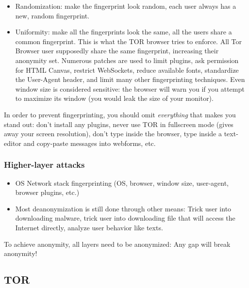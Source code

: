 \documentclass[11pt,oneside,a4paper]{article}
\begin{document}
\vspace{-\topsep}
\begin{itemize}
	\setlength{\itemsep}{0pt}
	\setlength{\parskip}{0pt}
	\item Randomization: make the fingerprint look random, each user always has a new, random fingerprint.
	\item Uniformity: make all the fingerprints look the same, all the users share a common	fingerprint. This is what the TOR browser tries to enforce. All Tor Browser user supposedly share the same fingerprint, increasing their anonymity set. Numerous patches are used to limit plugins, ask permission for HTML Canvas, restrict WebSockets, reduce available fonts, standardize the User-Agent header, and limit many other fingerprinting techniques. Even window size is considered sensitive: the browser will warn you if you attempt to maximize its window (you would leak the size of your monitor).
\end{itemize}
\vspace{-\topsep}

\noindent In order to prevent fingerprinting, you should omit \textit{everything} that makes you stand out: don't install any plugins, never use TOR in fullscreen mode (gives away your screen resolution), don't type inside the browser, type inside a text-editor and copy-paste messages into webforms, etc.

\subsubsection{Higher-layer attacks}

\vspace{-\topsep}
\begin{itemize}
	\setlength{\itemsep}{0pt}
	\setlength{\parskip}{0pt}
	\item OS Network stack fingerprinting (OS, browser, window size, user-agent, browser plugins, etc.)
	\item Most deanonymization is still done through other means: Trick user into downloading malware, trick user into downloading file that will access the Internet directly, analyze user behavior like texts.
\end{itemize}
\vspace{-\topsep}

\noindent To achieve anonymity, all layers need to be anonymized: Any gap will break anonymity!

\subsection{TOR}
\end{document}
